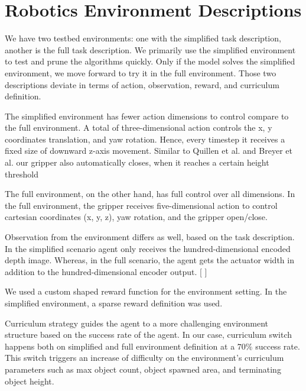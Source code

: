 \section{Robotics Environment Descriptions}

We have two testbed environments: one with the simplified task description, another is the full task description. We primarily use the simplified environment to test and prune the algorithms quickly. Only if the model solves the simplified environment, we move forward to try it in the full environment. Those two descriptions deviate in terms of action, observation, reward, and curriculum definition. 

The simplified environment has fewer action dimensions to control compare to the full environment. A total of three-dimensional action controls the x, y coordinates translation, and yaw rotation. Hence, every timestep it receives a fixed size of downward z-axis movement. Similar to Quillen et al. and Breyer et al. our gripper also automatically closes, when it reaches a certain height threshold

The full environment, on the other hand, has full control over all dimensions. In the full environment, the gripper receives five-dimensional action to control cartesian coordinates (x, y, z), yaw rotation, and the gripper open/close. 

Observation from the environment differs as well, based on the task description. In the simplified scenario agent only receives the hundred-dimensional encoded depth image. Whereas, in the full scenario, the agent gets the actuator width in addition to the hundred-dimensional encoder output. [ ]

We used a custom shaped reward function for the environment setting. In the simplified environment, a sparse reward definition was used. 

Curriculum strategy guides the agent to a more challenging environment structure based on the success rate of the agent. In our case, curriculum switch happens both on simplified and full environment definition at a \(70\%\) success rate. This switch triggers an increase of difficulty on the environment’s curriculum parameters such as max object count, object spawned area, and terminating object height.